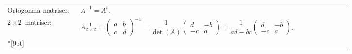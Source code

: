 \documentclass{article}
\begin{document}
\begin{tabular}{|p{0.2\linewidth}|p{0.745\linewidth}|}
  \\[3pt]
  Ortogonala matriser: & $A^{-1}=A^t$.
  \\
  $2\times 2$--matriser:&
  $A_{2\times2}^{-1}
  =\begin{pmatrix}
    a&b\\
    c&d
  \end{pmatrix}^{-1}
  =\dfrac1{\det(A)}
  \begin{pmatrix}
    d&-b\\
    -c&a
  \end{pmatrix}
  =\dfrac1{ad-bc}
  \begin{pmatrix}
    d&-b\\
    -c&a
  \end{pmatrix}$.
  \\*[9pt]\hline\end{tabular}%
\end{document}
